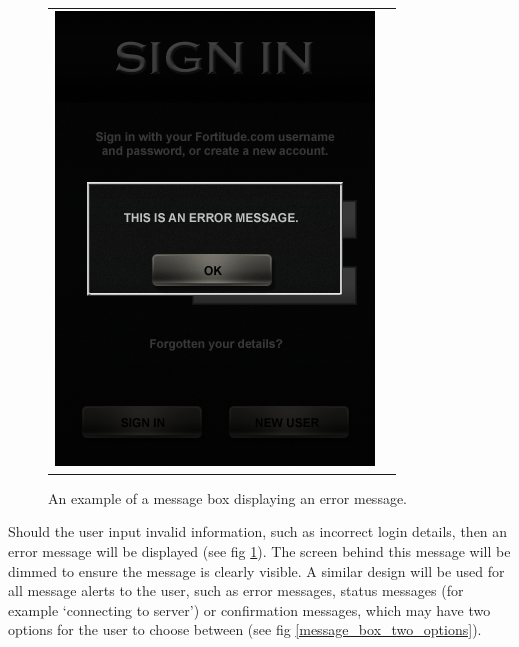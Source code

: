 \begin{figure}[h!]
\begin{tabular}{cc}
\begin{minipage}{0.3\textwidth}
\begin{center}
\begin{minipage}{0.83\textwidth}
		\includegraphics[width=\textwidth]{images/message_box_in_use_mockup}
		\caption{An example of a message box displaying an error message.}
		\label{message_box}
		\end{minipage}
		\end{center}
	\end{minipage}
\end{tabular}
\vspace{-0pt}
\end{figure}

Should the user input invalid information, such as incorrect login details, then an error message will be displayed (see fig \ref{message_box}). The screen behind this message will be dimmed to ensure the message is clearly visible. A similar design will be used for all message alerts to the user, such as error messages, status messages (for example `connecting to server') or confirmation messages, which may have two options for the user to choose between (see fig \ref{message_box_two_options}).

